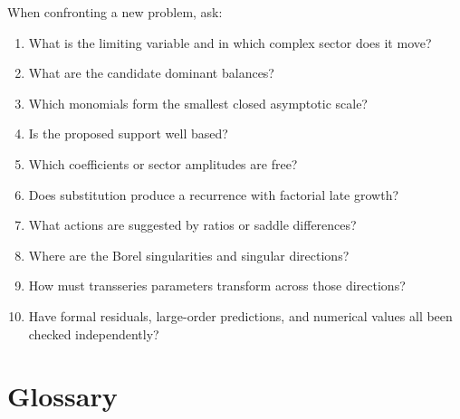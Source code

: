 \documentclass[11pt,oneside]{book}
\theoremstyle{definition}
\theoremstyle{remark}
\begin{document}
When confronting a new problem, ask:
\begin{enumerate}
\item What is the limiting variable and in which complex sector does it move?
\item What are the candidate dominant balances?
\item Which monomials form the smallest closed asymptotic scale?
\item Is the proposed support well based?
\item Which coefficients or sector amplitudes are free?
\item Does substitution produce a recurrence with factorial late growth?
\item What actions are suggested by ratios or saddle differences?
\item Where are the Borel singularities and singular directions?
\item How must transseries parameters transform across those directions?
\item Have formal residuals, large-order predictions, and numerical values all
been checked independently?
\end{enumerate}


\chapter{Glossary}
\label{ch:glossary}
\end{document}
